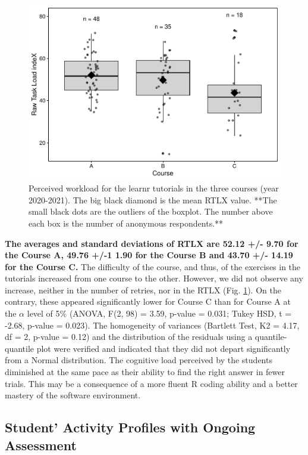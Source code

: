 \documentclass{aims}
\theoremstyle{definition}
\begin{document}
\begin{figure}
\includegraphics[width=1\linewidth]{teaching_data_science_files/figure-latex/fig_rtlx-1} \caption{\label{fig:fig_rtlx} Perceived workload for the learnr tutorials in the three courses (year 2020-2021). The big black diamond is the mean RTLX value. **The small black dots are the outliers of the boxplot. The number above each box is the number of anonymous respondents.**}\label{fig:fig_rtlx}
\end{figure}

\textbf{The averages and standard deviations of RTLX are 52.12 +/- 9.70
for the Course A, 49.76 +/-1 1.90 for the Course B and 43.70 +/- 14.19
for the Course C.} The difficulty of the course, and thus, of the
exercises in the tutorials increased from one course to the other.
However, we did not observe any increase, neither in the number of
retries, nor in the RTLX (Fig. \ref {fig:fig_rtlx}). On the contrary,
these appeared significantly lower for Course C than for Course A at the
\(\alpha\) level of 5\% (ANOVA, F(2, 98) = 3.59, p-value = 0.031; Tukey
HSD, t = -2.68, p-value = 0.023). The homogeneity of variances (Bartlett
Test, K2 = 4.17, df = 2, p-value = 0.12) and the distribution of the
residuals using a quantile-quantile plot were verified and indicated
that they did not depart significantly from a Normal distribution. The
cognitive load perceived by the students diminished at the same pace as
their ability to find the right answer in fewer trials. This may be a
consequence of a more fluent R coding ability and a better mastery of
the software environment.

\hypertarget{student-activity-profiles-with-ongoing-assessment}{%
\subsection{Student' Activity Profiles with Ongoing
Assessment}\label{student-activity-profiles-with-ongoing-assessment}}
\end{document}
